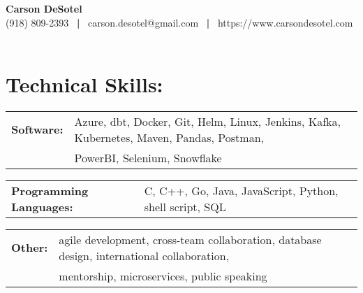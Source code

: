\documentclass[10pt]{article}
\begin{document}
	\begin{center}
		{\LARGE \textbf{Carson DeSotel}} \\
		\vspace{5pt} 		%
		(918) 809-2393 \ \textbf{|} \
		carson.desotel@gmail.com \ \textbf{|} \
		https://www.carsondesotel.com \
		
	\end{center}
	
	\section*{Technical Skills: \hrulefill}
		\begin{tabular}{@{}l@{\ }l}
		\textbf{Software:} & Azure, dbt, Docker, Git, Helm, Linux, Jenkins, Kafka, Kubernetes, Maven, Pandas, Postman, \\ & PowerBI, Selenium, Snowflake
		\end{tabular}
		
		\vspace{5pt}
		\noindent
		\begin{tabular}{@{}l@{\ }l}
		\textbf{Programming Languages: } & C, C++, Go, Java, JavaScript, Python, shell script, SQL\\
		\end{tabular}
		
		
		\vspace{5pt}
		\noindent
		\begin{tabular}{@{}l@{\ }l}
		\textbf{Other: } &  agile development, cross-team collaboration, database design, international collaboration, \\ & mentorship, microservices, public speaking \\
		\end{tabular}	
	
\end{document}
